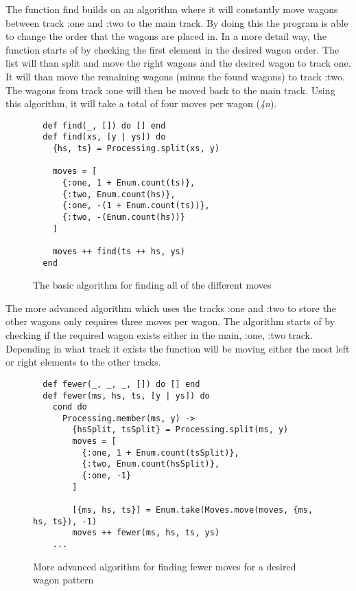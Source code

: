 \documentclass[a4paper,11pt]{article}
\begin{document}
The function find builds on an algorithm where it will constantly move wagons between track :one and :two to the main track. By doing this the program is able to change the order that the wagons are placed in. In a more detail way, the function starts of by checking the first element in the desired wagon order. The list will than split and move the right wagons and the desired wagon to track one. It will than move the remaining wagons (minus the found wagons) to track :two. The wagons from track :one will then be moved back to the main track. Using this algorithm, it will take a total of four moves per wagon (\textit{4n}).

\begin{figure}[H]
\begin{verbatim}
  def find(_, []) do [] end
  def find(xs, [y | ys]) do
    {hs, ts} = Processing.split(xs, y)

    moves = [
      {:one, 1 + Enum.count(ts)},
      {:two, Enum.count(hs)},
      {:one, -(1 + Enum.count(ts))},
      {:two, -(Enum.count(hs))}
    ]

    moves ++ find(ts ++ hs, ys)
  end
\end{verbatim}
\caption{The basic algorithm for finding all of the different moves}
\label{Figure:4}
\end{figure}

The more advanced algorithm which uses the tracks :one and :two to store the other wagons only requires three moves per wagon. The algorithm starts of by checking if the required wagon exists either in the main, :one, :two track. Depending in what track it exists the function will be moving either the most left or right elements to the other tracks.

\begin{figure}[H]
\begin{verbatim}
  def fewer(_, _, _, []) do [] end
  def fewer(ms, hs, ts, [y | ys]) do
    cond do
      Processing.member(ms, y) ->
        {hsSplit, tsSplit} = Processing.split(ms, y)
        moves = [
          {:one, 1 + Enum.count(tsSplit)},
          {:two, Enum.count(hsSplit)},
          {:one, -1}
        ]

        [{ms, hs, ts}] = Enum.take(Moves.move(moves, {ms, hs, ts}), -1)
        moves ++ fewer(ms, hs, ts, ys)
    ...
\end{verbatim}
\caption{More advanced algorithm for finding fewer moves for a desired wagon pattern}
\label{Figure:5}
\end{figure}
\end{document}
